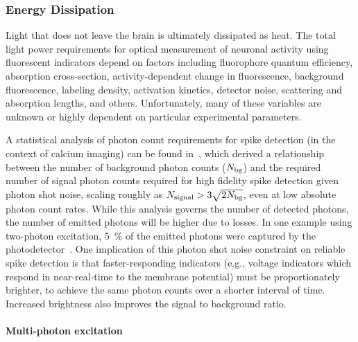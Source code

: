 \subsubsection{Energy Dissipation}

Light that does not leave the brain is ultimately dissipated as heat.
The total light power requirements for optical measurement of neuronal activity using fluorescent indicators depend on factors including
fluorophore quantum efficiency,
absorption cross-section,
activity-dependent change in fluorescence,
background fluorescence,
labeling density,
activation kinetics,
detector noise,
scattering and absorption lengths,
and others. Unfortunately, many of these variables are unknown or highly dependent on particular experimental parameters.

A statistical analysis of photon count requirements for spike detection (in the context of calcium imaging) can be found in~\cite{wilt13}, which derived a relationship between the number of background photon counts ($N_{\text{\scriptsize bg}}$) and the required number of signal photon counts required for high fidelity spike detection given photon shot noise, scaling roughly as $N_{\text{\scriptsize signal}} > 3\sqrt{2N_{\text{\scriptsize bg}}}$, even at low absolute photon count rates.
While this analysis governs the number of detected photons, the number of emitted photons will be higher due to losses.
In one example using two-photon excitation, \SI{5}{\percent} of the emitted photons were captured by the photodetector~\cite{kim99}. One implication of this photon shot noise constraint on reliable spike detection is that faster-responding indicators (e.g., voltage indicators which respond in near-real-time to the membrane potential) must be proportionately brighter, to achieve the same photon counts over a shorter interval of time. Increased brightness also improves the signal to background ratio.

\paragraph{Multi-photon excitation}

